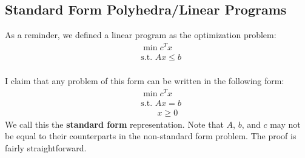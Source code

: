 \documentclass[12pt]{article}
\begin{document}
\subsection{Standard Form Polyhedra/Linear Programs}
As a reminder, we defined a linear program as the optimization problem: 
\begin{align*}
&\min c^T x \\
&\text{s.t. } Ax \leq b \\
\end{align*}

I claim that any problem of this form can be written in the following form: 
\begin{align*}
&\min c^T x \\
&\text{s.t. } Ax = b \\
&\;\;\;\;\;\;\; x \geq 0
\end{align*}
We call this the \textbf{standard form} representation. Note that $A$, $b$, and $c$ may not be equal to their counterparts in the non-standard form problem. 
The proof is fairly straightforward. 
\end{document}
